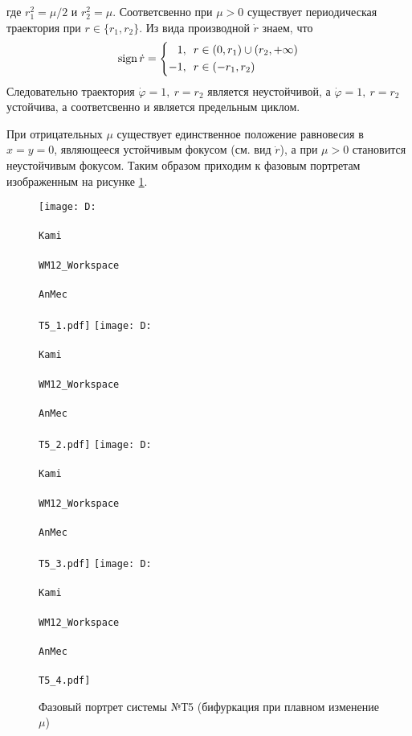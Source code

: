 где $r_1^2 = \mu/2$ и $r_2^2 = \mu$. Соответсвенно при $\mu > 0$ существует периодическая траектория при $r \in \{r_1, r_2\}$. Из вида производной $\dot{r}$ знаем, что 
\begin{equation*}
    \mathop{\mathrm{sign}}\nolimits \dot{r} = \left\{\begin{aligned}
        1, & \ \ r \in (0, r_1) \cup (r_2, + \infty) \\
        -1, & \ \ r \in (-r_1, r_2)
    \end{aligned}\right.
\end{equation*}
Следовательно траектория $\dot{\varphi} = 1, \ r = r_2$ является неустойчивой, а $\dot{\varphi} = 1, \ r = r_2$ устойчива, а соответсвенно и является предельным циклом. 

При отрицательных $\mu$ существует единственное положение равновесия в $x = y = 0$, являющееся устойчивым фокусом (см. вид $\dot{r}$), а при $\mu > 0$ становится неустойчивым фокусом. Таким образом приходим к фазовым портретам изображенным на рисунке \ref{T5}.



\begin{figure}
    \centering
    \texttt{[image: D:\\\\Kami\\\\WM12\_Workspace\\\\AnMec\\\\T5\_1.pdf]}
    \hspace{0.2cm}
    \texttt{[image: D:\\\\Kami\\\\WM12\_Workspace\\\\AnMec\\\\T5\_2.pdf]}
    \hspace{0.2cm}
    \texttt{[image: D:\\\\Kami\\\\WM12\_Workspace\\\\AnMec\\\\T5\_3.pdf]}
    \hspace{0.2cm}
    \texttt{[image: D:\\\\Kami\\\\WM12\_Workspace\\\\AnMec\\\\T5\_4.pdf]}
    \caption{Фазовый портрет системы №Т5 (бифуркация при плавном изменение $\mu$)}
    \label{T5}
\end{figure}
